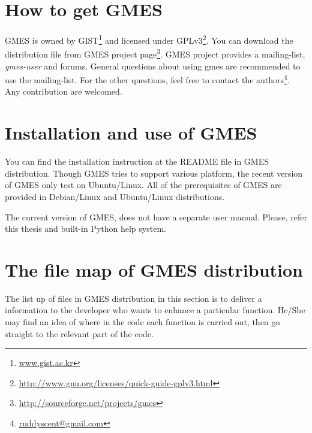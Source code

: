 %
%

\section{How to get GMES}
GMES is owned by GIST\footnote{\url{www.gist.ac.kr}} and licensed under GPLv3\footnote{\url{http://www.gnu.org/licenses/quick-guide-gplv3.html}}. You can download the distribution file from GMES project page\footnote{\url{http://sourceforge.net/projects/gmes}}. GMES project provides a mailing-list, \emph{gmes-user} and forums. General questions about using gmes are recommended to use the mailing-list. For the other questions, feel free to contact the authors\footnote{\href{mailto:ruddyscent@gmail.com}{ruddyscent@gmail.com}}. Any contribution are welcomed.

\section{Installation and use of GMES}
You can find the installation instruction at the README file in GMES distribution. Though GMES tries to support various platform, the recent version of GMES only test on Ubuntu/Linux. All of the prerequisites of GMES are provided in Debian/Linux and Ubuntu/Linux distributions.

The current version of GMES, does not have a separate user manual. Please, refer this thesis and built-in Python help system.

\section{The file map of GMES distribution}
The list up of files in GMES distribution in this section is to deliver a information to the developer who wants to enhance a particular function. He/She may find an idea of where in the code each function is carried out, then go straight to the relevant part of the code.

